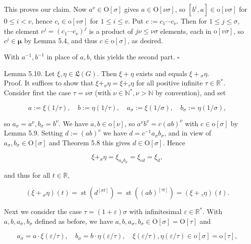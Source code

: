 \documentclass[10pt]{article}
\begin{document}
This proves our claim. Now $a^{\nu} \in \mathrm{O}[\sigma]$ gives $a \in \mathrm{O}[\nu \sigma]$, so $\left[b^{i}, a\right] \in \mathrm{o}[\nu \sigma]$ for $0 \leq i<v$, hence $c_{i} \in \mathrm{o}[v \sigma]$ for $1 \leq i \leq v$. Put $c:=c_{1} \cdots c_{\nu}$. Then for $1 \leq j \leq \sigma$, the element $c^{j}=\left(c_{1} \cdots c_{\nu}\right)^{j}$ is a product of $j \nu \leq \nu \sigma$ elements, each in $\mathrm{o}[v \sigma]$, so $c^{j} \in \boldsymbol{\mu}$ by Lemma 5.4, and thus $c \in \mathrm{o}[\sigma]$, as desired.

With $a^{-1}, b^{-1}$ in place of $a, b$, this yields the second part. \(\square\)

Lemma 5.10. Let $\xi, \eta \in \mathfrak{L}(G)$. Then $\xi+\eta$ exists and equals $\xi+{ }_{\sigma} \eta$.\\
Proof. It suffices to show that $\xi+_{\sigma} \eta=\xi+_{\tau} \eta$ for all positive infinite $\tau \in \mathbb{R}^{*}$. Consider first the case $\tau=\nu \sigma$ (with $\nu \in \mathbb{N}^{*}, \nu>\mathbb{N}$ by convention), and set

$$
a:=\xi(1 / \tau), \quad b:=\eta(1 / \tau), \quad a_{\sigma}:=\xi(1 / \sigma), \quad b_{\sigma}:=\eta(1 / \sigma),
$$

so $a_{\sigma}=a^{\nu}, b_{\sigma}=b^{\nu}$. We have $a, b \in \mathrm{o}[\nu]$, so $a^{\nu} b^{\nu}=c(a b)^{\nu}$ with $c \in \mathrm{o}[\sigma]$ by Lemma 5.9. Setting $d:=(a b)^{v}$ we have $d=c^{-1} a_{\sigma} b_{\sigma}$, and in view of $a_{\sigma}, b_{\sigma} \in \mathrm{O}[\sigma]$ and Theorem 5.8 this gives $d \in \mathrm{O}[\sigma]$. Hence

$$
\xi+_{\sigma} \eta=\xi_{a_{\sigma} b_{\sigma}}=\xi_{c d}=\xi_{d},
$$

and thus for all $t \in \mathbb{R}$,

$$
\left(\xi+{ }_{\sigma} \eta\right)(t)=\operatorname{st}\left(d^{[\sigma t]}\right)=\operatorname{st}\left((a b)^{[\tau t]}\right)=\left(\xi+{ }_{\tau} \eta\right)(t) .
$$

Next we consider the case $\tau=(1+\varepsilon) \sigma$ with infinitesimal $\varepsilon \in \mathbb{R}^{*}$. With $a, b, a_{\sigma}, b_{\sigma}$ defined as before, we have $a, b, a_{\sigma}, b_{\sigma} \in \mathrm{O}[\sigma]=\mathrm{O}[\tau]$ and

$$
a_{\sigma}=a \cdot \xi(\varepsilon / \tau), \quad b_{\sigma}=b \cdot \eta(\varepsilon / \tau), \quad \xi(\varepsilon / \tau), \eta(\varepsilon / \tau) \in \mathrm{o}[\sigma]=\mathrm{o}[\tau],
$$
\end{document}
